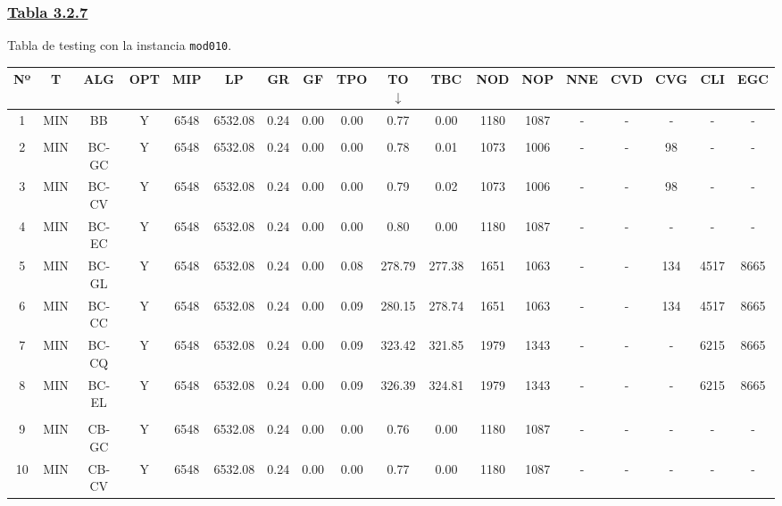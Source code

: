 \newpage

\subsubsection*{\underline{Tabla 3.2.7}}
\noindent Tabla de testing con la instancia \verb_mod010_.\\

{
\footnotesize\centering
\hspace*{-5mm}\begin{tabular}{ *{17}{c|} c }
\hline
\textbf{Nº} & \textbf{T} & \textbf{ALG} & \textbf{OPT} & \textbf{MIP} & \textbf{LP} & \textbf{GR} & \textbf{GF} & \textbf{TPO} & \textbf{TO} $\downarrow$ & \textbf{TBC} & \textbf{NOD} & \textbf{NOP} & \textbf{NNE} & \textbf{CVD} & \textbf{CVG} & \textbf{CLI} & \textbf{EGC}\\
\hline
1 & MIN & BB & Y & 6548 & 6532.08 & 0.24 & 0.00 & 0.00 & 0.77 & 0.00 & 1180 & 1087 & - & - & - & - & -\\
\hline
\multicolumn{18}{c}{}
\\
\hline
2 & MIN & BC-GC & Y & 6548 & 6532.08 & 0.24 & 0.00 & 0.00 & 0.78 & 0.01 & 1073 & 1006 & - & - & 98 & - & -\\
\hline
3 & MIN & BC-CV & Y & 6548 & 6532.08 & 0.24 & 0.00 & 0.00 & 0.79 & 0.02 & 1073 & 1006 & - & - & 98 & - & -\\
\hline
4 & MIN & BC-EC & Y & 6548 & 6532.08 & 0.24 & 0.00 & 0.00 & 0.80 & 0.00 & 1180 & 1087 & - & - & - & - & -\\
\hline
5 & MIN & BC-GL & Y & 6548 & 6532.08 & 0.24 & 0.00 & 0.08 & 278.79 & 277.38 & 1651 & 1063 & - & - & 134 & 4517 & 8665\\
\hline
6 & MIN & BC-CC & Y & 6548 & 6532.08 & 0.24 & 0.00 & 0.09 & 280.15 & 278.74 & 1651 & 1063 & - & - & 134 & 4517 & 8665\\
\hline
7 & MIN & BC-CQ & Y & 6548 & 6532.08 & 0.24 & 0.00 & 0.09 & 323.42 & 321.85 & 1979 & 1343 & - & - & - & 6215 & 8665\\
\hline
8 & MIN & BC-EL & Y & 6548 & 6532.08 & 0.24 & 0.00 & 0.09 & 326.39 & 324.81 & 1979 & 1343 & - & - & - & 6215 & 8665\\
\hline
\multicolumn{18}{c}{}
\\
\hline
9 & MIN & CB-GC & Y & 6548 & 6532.08 & 0.24 & 0.00 & 0.00 & 0.76 & 0.00 & 1180 & 1087 & - & - & - & - & -\\
\hline
10 & MIN & CB-CV & Y & 6548 & 6532.08 & 0.24 & 0.00 & 0.00 & 0.77 & 0.00 & 1180 & 1087 & - & - & - & - & -\\

\end{tabular}}
